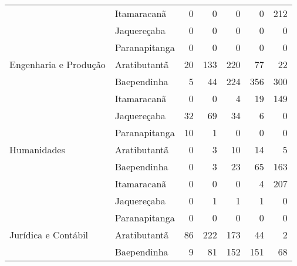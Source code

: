 \begin{table}[ht]
\begin{tabular}{ll rrrrr}
                          & Itamaracanã             &                  0 &            0 &           0 &          0 &              212 \\ 
                          & Jaquereçaba             &                  0 &            0 &           0 &          0 &                0 \\ 
                          & Paranapitanga           &                  0 &            0 &           0 &          0 &                0 \\ 
\midrule
  Engenharia e Produção   & Aratibutantã            &                 20 &          133 &         220 &         77 &               22 \\ 
                          & Baependinha             &                  5 &           44 &         224 &        356 &              300 \\ 
                          & Itamaracanã             &                  0 &            0 &           4 &         19 &              149 \\ 
                          & Jaquereçaba             &                 32 &           69 &          34 &          6 &                0 \\ 
                          & Paranapitanga           &                 10 &            1 &           0 &          0 &                0 \\ 
\midrule
  Humanidades             & Aratibutantã            &                  0 &            3 &          10 &         14 &                5 \\ 
                          & Baependinha             &                  0 &            3 &          23 &         65 &              163 \\ 
                          & Itamaracanã             &                  0 &            0 &           0 &          4 &              207 \\ 
                          & Jaquereçaba             &                  0 &            1 &           1 &          1 &                0 \\ 
                          & Paranapitanga           &                  0 &            0 &           0 &          0 &                0 \\ 
\midrule
  Jurídica e Contábil     & Aratibutantã            &                 86 &          222 &         173 &         44 &                2 \\ 
                          & Baependinha             &                  9 &           81 &         152 &        151 &               68 \\ 

\end{tabular}
\end{table}
